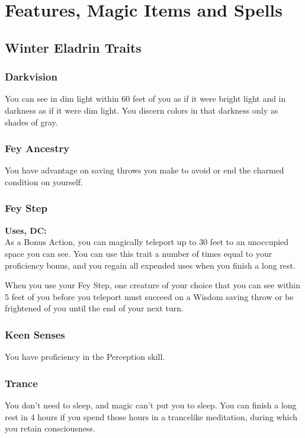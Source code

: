 \documentclass[letterpaper,openany,oneside,twocolumn]{book}
\begin{document}
\onecolumn


\rendercharactersheet

\renderbackgroundsheet

\renderspellsheet


\restoregeometry
\twocolumn

\chapter*{Features, Magic Items and Spells}
\section*{Winter Eladrin Traits}
\subsection*{Darkvision}
You can see in dim light within 60 feet of you as if it were bright light and in darkness as if it were dim light. You discern colors in that darkness only as shades of gray.
\subsection*{Fey Ancestry}
You have advantage on saving throws you make to avoid or end the charmed condition on yourself.
\subsection*{Fey Step}
\textbf{ Uses, DC: }\\
As a Bonus Action, you can magically teleport up to 30 feet to an unoccupied space you can see. You can use this trait a number of times equal to your proficiency bonus, and you regain all expended uses when you finish a long rest.

When you use your Fey Step, one creature of your choice that you can see within 5 feet of you before you teleport must succeed on a Wisdom saving throw or be frightened of you until the end of your next turn.
\subsection*{Keen Senses}
You have proficiency in the Perception skill.
\subsection*{Trance}
You don't need to sleep, and magic can't put you to sleep. You can finish a long rest in 4 hours if you spend those hours in a trancelike meditation, during which you retain consciousness.
\end{document}
